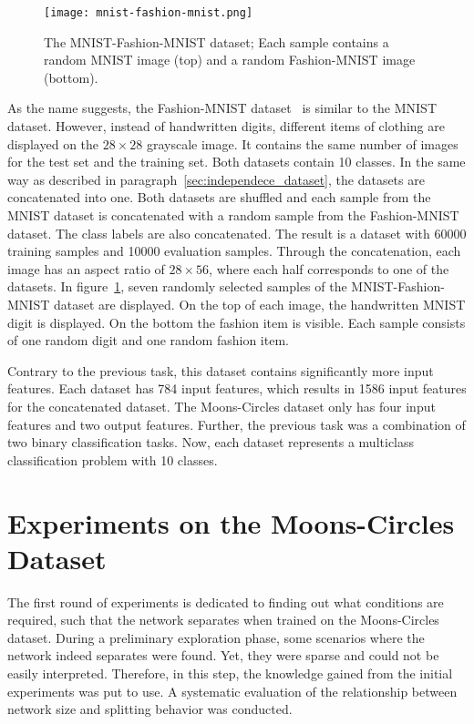 \begin{figure}[t]
    \centering\texttt{[image: mnist-fashion-mnist.png]}
    \caption[MNIST-Fashion-MNIST dataset]{
        The MNIST-Fashion-MNIST dataset; Each sample contains a random MNIST image (top) and a random Fashion-MNIST image (bottom).
    }\label{fig:mnist_fashion}
\end{figure}

As the name suggests, the Fashion-MNIST dataset~\autocite{fashion} is similar to the MNIST dataset.
However, instead of handwritten digits, different items of clothing are displayed on the $28 \times 28$ grayscale image.
It contains the same number of images for the test set and the training set.
Both datasets contain 10 classes.
In the same way as described in paragraph~\ref{sec:independece_dataset}, the datasets are concatenated into one.
Both datasets are shuffled and each sample from the MNIST dataset is concatenated with a random sample from the Fashion-MNIST dataset.
The class labels are also concatenated.
The result is a dataset with 60000 training samples and 10000 evaluation samples.
Through the concatenation, each image has an aspect ratio of $28 \times 56$, where each half corresponds to one of the datasets.
In figure~\ref{fig:mnist_fashion}, seven randomly selected samples of the  MNIST-Fashion-MNIST dataset are displayed.
On the top of each image, the handwritten MNIST digit is displayed. 
On the bottom the fashion item is visible.
Each sample consists of one random digit and one random fashion item. 

Contrary to the previous task, this dataset contains significantly more input features.
Each dataset has 784 input features, which results in 1586 input features for the concatenated dataset.
The Moons-Circles dataset only has four input features and two output features.
Further, the previous task was a combination of two binary classification tasks.
Now, each dataset represents a multiclass classification problem with 10 classes.

\newpage
\section{Experiments on the Moons-Circles Dataset}
The first round of experiments is dedicated to finding out what conditions are required, such that the network separates when trained on the Moons-Circles dataset.
During a preliminary exploration phase, some scenarios where the network indeed separates were found.
Yet, they were sparse and could not be easily interpreted.
Therefore, in this step, the knowledge gained from the initial experiments was put to use.
A systematic evaluation of the relationship between network size and splitting behavior was conducted.

